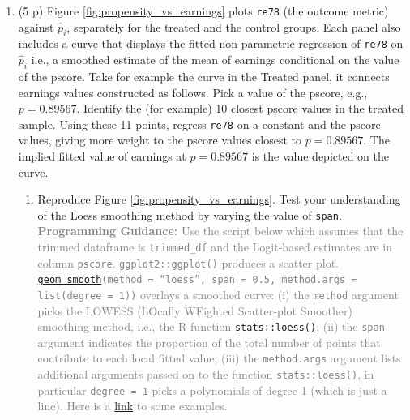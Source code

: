 \documentclass[
]{article}
\providecommand{\tightlist}{%
  \setlength{\itemsep}{0pt}\setlength{\parskip}{0pt}}
\begin{document}
\begin{enumerate}
\def\labelenumi{\arabic{enumi}.}
\setcounter{enumi}{1}
\item
  (5 p) Figure \ref{fig:propensity_vs_earnings} plots \texttt{re78} (the
  outcome metric) against \(\widehat{p}_{i}\), separately for the
  treated and the control groups. Each panel also includes a curve that
  displays the fitted non-parametric regression of \texttt{re78} on
  \(\widehat{p}_{i}\) i.e., a smoothed estimate of the mean of earnings
  conditional on the value of the pscore. Take for example the curve in
  the Treated panel, it connects earnings values constructed as follows.
  Pick a value of the pscore, e.g., \(p=0.89567\). Identify the (for
  example) 10 closest pscore values in the treated sample. Using these
  11 points, regress \texttt{re78} on a constant and the pscore values,
  giving more weight to the pscore values closest to \(p=0.89567\). The
  implied fitted value of earnings at \(p=0.89567\) is the value
  depicted on the curve.

  \begin{enumerate}
  \def\labelenumii{\alph{enumii}.}
  \tightlist
  \item
    Reproduce Figure \ref{fig:propensity_vs_earnings}. Test your
    understanding of the Loess smoothing method by varying the value of
    \texttt{span}.
    \textcolor{gray}{\textbf{Programming Guidance:} Use the script below which assumes that the trimmed dataframe is \texttt{trimmed\_df} and the Logit-based estimates are in column \texttt{pscore}. \texttt{ggplot2::ggplot()} produces a scatter plot. \href{https://ggplot2.tidyverse.org/reference/geom_smooth.html}{\texttt{geom\_smooth}}\texttt{(method = ``loess'', span = 0.5, method.args = list(degree = 1))} overlays a smoothed curve: (i) the \texttt{method} argument picks the LOWESS (LOcally WEighted Scatter-plot Smoother) smoothing method, i.e., the R function \href{https://www.rdocumentation.org/packages/stats/versions/3.6.2/topics/loess}{\texttt{stats::loess()}}; (ii) the \texttt{span} argument indicates the proportion of the total number of points that contribute to each local fitted value; (iii) the \texttt{method.args} argument lists additional arguments passed on to the function \texttt{stats::loess()}, in particular \texttt{degree = 1} picks a polynomials of degree 1 (which is just a line). Here is a \href{https://ggplot2.tidyverse.org/reference/geom_smooth.html}{link} to some examples.}
  \end{enumerate}


\end{enumerate}
\end{document}
